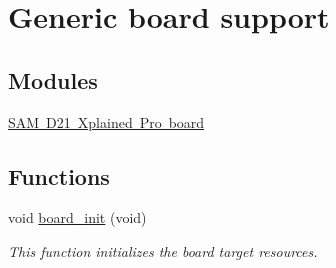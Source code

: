 \hypertarget{group__group__common__boards}{}\section{Generic board support}
\label{group__group__common__boards}
\subsection*{Modules}
\begin{DoxyCompactItemize}
\item 
\mbox{\hyperlink{group__samd21__xplained__pro__group}{S\+A\+M D21 Xplained Pro board}}
\end{DoxyCompactItemize}
\subsection*{Functions}
\begin{DoxyCompactItemize}
\item 
void \mbox{\hyperlink{group__group__common__boards_ga916f2adc2080b4fe88034086d107a8dc}{board\+\_\+init}} (void)
\begin{DoxyCompactList}\small\item\em This function initializes the board target resources. \end{DoxyCompactList}\end{DoxyCompactItemize}
